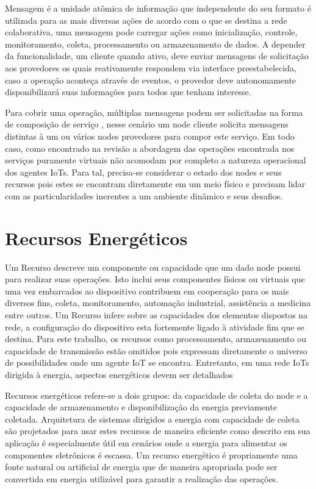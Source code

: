 Mensagem é a unidade atômica de informação que independente do seu formato é utilizada para as mais diversas ações de acordo com o que se destina a rede colaborativa, uma mensagem pode carregar ações como  inicialização, controle, monitoramento, coleta, processamento ou armazenamento de dados. A depender da funcionalidade, um cliente quando ativo, deve enviar mensagens de solicitação aos provedores os quais reativamente respondem via interface preestabelecida, caso a operação aconteça através de eventos, o provedor deve autonomamente disponibilizará suas informações para todos que tenham interesse.

Para cobrir uma operação, múltiplas mensagens podem ser solicitadas na forma de composição de serviço \cite{service_composition}, nesse cenário um node cliente solicita mensagens distintas à um ou vários nodes provedores para compor este serviço. Em todo caso, como encontrado na revisão \cite{kahloul_service_2019} a abordagem das operações encontrada nos serviços puramente virtuais não acomodam por completo a natureza operacional dos agentes \acp{IoT}. Para tal, precisa-se considerar o estado dos nodes e seus recursos pois estes se encontram diretamente em um meio físico e precisam lidar com as particularidades inerentes a um ambiente dinâmico e seus desafios.

\section{Recursos Energéticos}

Um Recurso descreve um componente ou capacidade que um dado node possui para realizar suas operações. Isto inclui seus componentes físicos ou virtuais que uma vez embarcados ao dispositivo contribuem em cooperação para os mais diversos fins, coleta, monitoramento, automação industrial, assistência a medicina entre outros. Um Recurso infere sobre as capacidades dos elementos dispostos na rede, a configuração do dispositivo esta fortemente ligado à atividade fim que se destina. Para este trabalho, os recursos como processamento, armazenamento ou capacidade de transmissão estão omitidos pois expressam diretamente o universo de possibilidades onde um agente \acs{IoT} se encontra. Entretanto, em uma rede \acp{IoT} dirigida à energia, aspectos energéticos devem ser detalhados

Recursos energéticos refere-se a dois grupos: da capacidade de coleta do node e a capacidade de armazenamento e disponibilização da energia previamente coletada. Arquitetura de sistemas dirigidos a energia com capacidade de coleta são projetados para usar estes recursos de maneira eficiente como descrito em \cite{prauzek_energy_2018} sua aplicação é especialmente útil em cenários onde a energia para alimentar os componentes eletrônicos é escassa. Um recurso energético é propriamente uma fonte natural ou artificial de energia que de maneira apropriada pode ser convertida em energia utilizável para garantir a realização das operações. 

